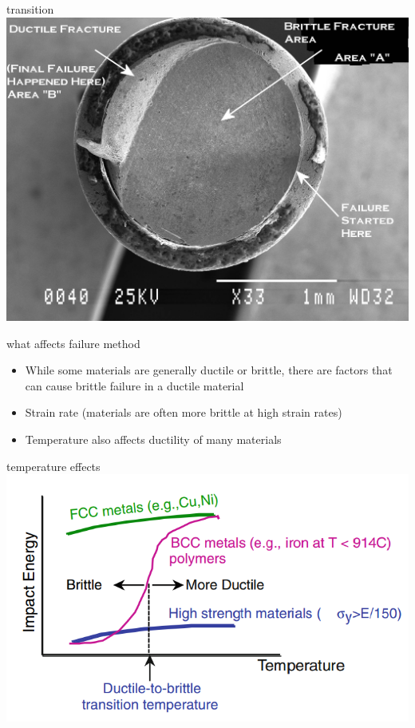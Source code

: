 \documentclass[
  letterpaper,
  ignorenonframetext,
  aspectratio=43,
  handout,
  12pt]{beamer}
\providecommand{\tightlist}{%
  \setlength{\itemsep}{0pt}\setlength{\parskip}{0pt}}
\providecommand{\tightlist}{%
\setlength{\itemsep}{0pt}\setlength{\parskip}{0pt}}
\let\Oldincludegraphics\includegraphics
\renewcommand{\includegraphics}[2][]{\Oldincludegraphics[width=\textwidth,height=0.7\textheight,keepaspectratio]{#2}}
\begin{document}
\begin{frame}{transition}
\protect\hypertarget{transition}{}
\includegraphics{../images/transition.jpg}
\end{frame}

\begin{frame}{what affects failure method}
\protect\hypertarget{what-affects-failure-method}{}
\begin{itemize}
\tightlist
\item
  While some materials are generally ductile or brittle, there are
  factors that can cause brittle failure in a ductile material
\item
  Strain rate (materials are often more brittle at high strain rates)
\item
  Temperature also affects ductility of many materials
\end{itemize}
\end{frame}

\begin{frame}{temperature effects}
\protect\hypertarget{temperature-effects}{}
\includegraphics{../images/temperature.PNG}
\end{frame}
\end{document}
